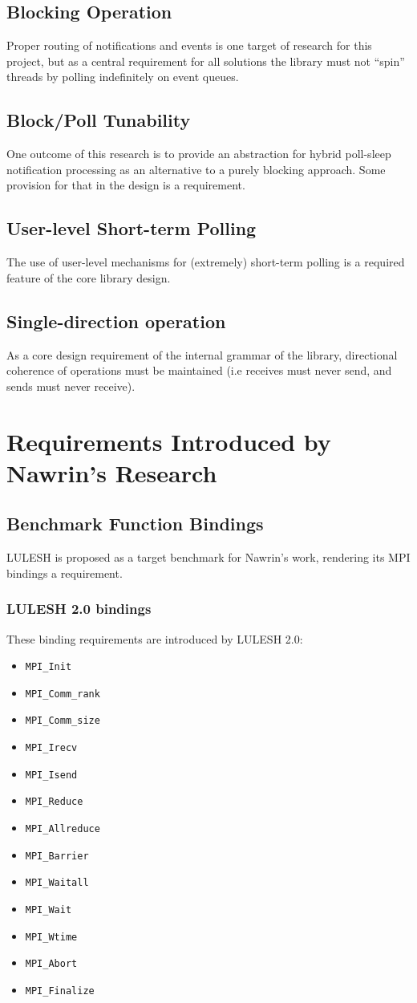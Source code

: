 \documentclass{article}
\newcommand{\itemtt}[1]{\item \texttt{#1}}
\begin{document}
\subsection{Blocking Operation}

Proper routing of notifications and events is one target of research for this project, but as a central requirement for all solutions the library must not ``spin'' threads by polling indefinitely on event queues.

\subsection{Block/Poll Tunability}

One outcome of this research is to provide an abstraction for hybrid poll-sleep notification processing as an alternative to a purely blocking approach.  Some provision for that in the design is a requirement.

\subsection{User-level Short-term Polling}

The use of user-level mechanisms for (extremely) short-term polling is a required feature of the core library design.

\subsection{Single-direction operation}

As a core design requirement of the internal grammar of the library, directional coherence of operations must be maintained (i.e receives must never send, and sends must never receive).

\section{Requirements Introduced by Nawrin's Research}

\subsection{Benchmark Function Bindings}

LULESH is proposed as a target benchmark for Nawrin's work, rendering its MPI bindings a requirement.

\subsubsection{LULESH 2.0 bindings}
These binding requirements are introduced by LULESH 2.0:
\begin{itemize}
\itemtt{MPI\_Init}
\itemtt{MPI\_Comm\_rank}
\itemtt{MPI\_Comm\_size}
\itemtt{MPI\_Irecv}
\itemtt{MPI\_Isend}
\itemtt{MPI\_Reduce}
\itemtt{MPI\_Allreduce}
\itemtt{MPI\_Barrier}
\itemtt{MPI\_Waitall}
\itemtt{MPI\_Wait}
\itemtt{MPI\_Wtime}
\itemtt{MPI\_Abort}
\itemtt{MPI\_Finalize}
\end{itemize}
\end{document}
